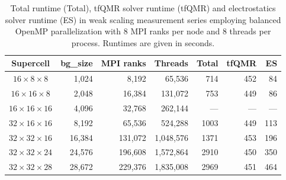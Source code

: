 \begin{table}[h!]
  \caption{Total runtime (Total), tfQMR solver runtime (tfQMR) and electrostatics solver runtime (ES)
  in weak scaling measurement series employing balanced OpenMP parallelization
  with $8$ MPI ranks per node and $8$ threads per process. Runtimes are given in seconds.}
\begin{center}
\begin{tabular}{|c|r|r|r|r|r|r|}
\hline
 Supercell               & bg\_size & MPI ranks &   Threads & Total & tfQMR &  ES \\
\hline\hline
$16 \times  8 \times  8$ &  1,024   &   8,192   &    65,536 &   714 &   452 &  84 \\
$16 \times 16 \times  8$ &  2,048   &  16,384   &   131,072 &   753 &   449 &  86 \\
$16 \times 16 \times 16$ &  4,096   &  32,768   &   262,144 &   --- &   --- & --- \\
$32 \times 16 \times 16$ &  8,192   &  65,536   &   524,288 &  1003 &   449 & 113 \\
$32 \times 32 \times 16$ & 16,384   & 131,072   & 1,048,576 &  1371 &   453 & 196 \\
$32 \times 32 \times 24$ & 24,576   & 196,608   & 1,572,864 &  2910 &   450 & 350 \\
$32 \times 32 \times 28$ & 28,672   & 229,376   & 1,835,008 &  2969 &   451 & 464 \\
\hline
\end{tabular}
\end{center}
\label{kkrnano:mnge_weakscaling_balancedomp}
\end{table}

